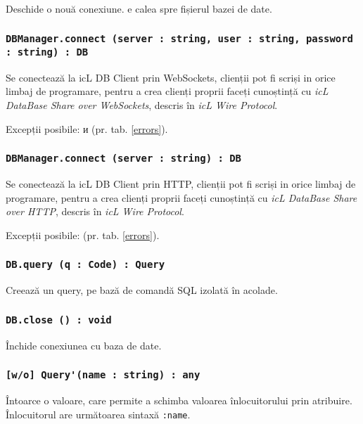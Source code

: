 Deschide o nouă conexiune.  e calea spre fișierul bazei de date.

\subsubsection{\lstinline|DBManager.connect (server : string, user : string, password : string) : DB|}

Se conectează la icL DB Client prin WebSockets, clienții pot fi scriși in orice limbaj de programare, pentru a crea clienți proprii faceți cunoștință cu \textit{icL DataBase Share over WebSockets}, descris în \textit{icL Wire Protocol}.

Excepții posibile:  и  (pr. tab. \ref{errors}).

\subsubsection{\lstinline|DBManager.connect (server : string) : DB|}

Se conectează la icL DB Client prin HTTP, clienții pot fi scriși in orice limbaj de programare, pentru a crea clienți proprii faceți cunoștință cu \textit{icL DataBase Share over HTTP}, descris în \textit{icL Wire Protocol}.

Excepții posibile:  (pr. tab. \ref{errors}).

\subsubsection{\lstinline|DB.query (q : Code) : Query|}

Creează un query, pe bază de comandă SQL izolată în acolade.

\subsubsection{\lstinline|DB.close () : void|}

Închide conexiunea cu baza de date.

\subsubsection{\lstinline|[w/o] Query'(name : string) : any|}

Întoarce o valoare, care permite a schimba valoarea înlocuitorului prin atribuire. Înlocuitorul are următoarea sintaxă \lstinline|:name|.

